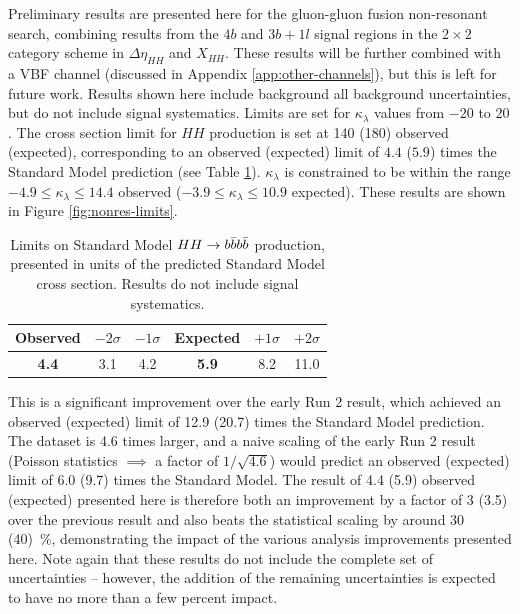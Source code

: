 Preliminary results are presented here for the gluon-gluon fusion non-resonant search, combining results from the $4b$ 
and $3b+1l$ signal regions in the $2\times 2$ category scheme in $\Delta \eta_{HH}$ and $X_{HH}$. These results will be 
further combined with a VBF channel (discussed in Appendix \ref{app:other-channels}), but this is left for future work. 
Results shown here include 
background all background uncertainties, but do not include signal systematics. Limits are set for $\kappa_{\lambda}$ 
values from $-20$ to $20$. 
The cross section limit for $HH$ production is set at \SI{140}{\fb} (\SI{180}{\fb}) observed (expected), 
corresponding to an observed (expected) limit of $4.4$ ($5.9$) times the Standard Model prediction 
(see Table \ref{tbl:SM-HH-limits}). 
$\kappa_{\lambda}$ is constrained to be within the range $-4.9 \leq \kappa_{\lambda} \leq 14.4$ observed 
($-3.9 \leq \kappa_{\lambda} \leq 10.9$ expected). These results are shown in Figure \ref{fig:nonres-limits}.

\begin{table}
\centering
\begin{tabular}{ |c|c|c|c|c|c| } 
\hline
\textbf{Observed} & $-2\sigma$ & $-1\sigma$ & \textbf{Expected} & $+1\sigma$ & $+2\sigma$\\
 \hline
\textbf{4.4}	& 3.1	& 4.2 & \textbf{5.9}	& 8.2 & 11.0\\
 \hline
\end{tabular}
 \caption{\label{tbl:SM-HH-limits} Limits on Standard Model $HH\rightarrow b\bar{b}b\bar{b}$ production, presented in units of the 
predicted Standard Model cross section. Results do not include signal systematics.}
\end{table}

This is a significant improvement over the early Run 2 result, which achieved an observed (expected) 
limit of 12.9 (20.7) times the Standard Model prediction. The dataset is 4.6 times larger, and a naive scaling 
of the early Run 2 result (Poisson statistics $\implies$ a factor of $1/\sqrt{4.6}$) would predict an observed (expected)
limit of 6.0 (9.7) times the Standard Model. The result of 4.4 (5.9) observed (expected) presented here is 
therefore both an improvement by a factor of 3 (3.5) over the previous result and also beats the statistical 
scaling by around 30 (40)~\%, demonstrating the impact of the various analysis improvements presented here. Note again that these results do not include the complete set of uncertainties -- however, the addition 
of the remaining uncertainties is expected to have no more than a few percent impact.

